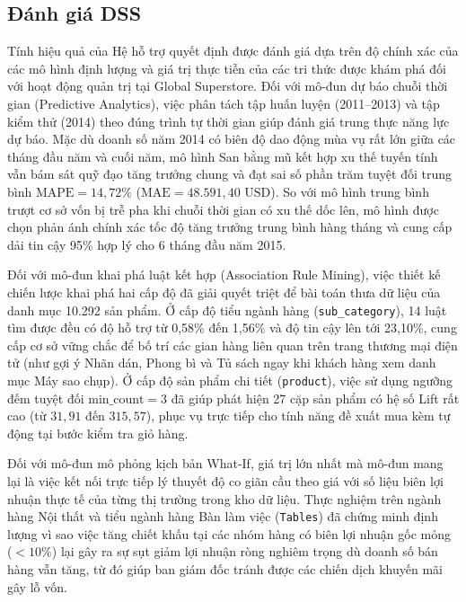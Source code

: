 \subsection{Đánh giá DSS}

Tính hiệu quả của Hệ hỗ trợ quyết định được đánh giá dựa trên độ chính xác của các mô hình định lượng và giá trị thực tiễn của các tri thức được khám phá đối với hoạt động quản trị tại Global Superstore. Đối với mô-đun dự báo chuỗi thời gian (Predictive Analytics), việc phân tách tập huấn luyện (2011--2013) và tập kiểm thử (2014) theo đúng trình tự thời gian giúp đánh giá trung thực năng lực dự báo. Mặc dù doanh số năm 2014 có biên độ dao động mùa vụ rất lớn giữa các tháng đầu năm và cuối năm, mô hình San bằng mũ kết hợp xu thế tuyến tính vẫn bám sát quỹ đạo tăng trưởng chung và đạt sai số phần trăm tuyệt đối trung bình $\text{MAPE} = 14,72\%$ ($\text{MAE} = 48.591,40\text{ USD}$). So với mô hình trung bình trượt cơ sở vốn bị trễ pha khi chuỗi thời gian có xu thế dốc lên, mô hình được chọn phản ánh chính xác tốc độ tăng trưởng trung bình hàng tháng và cung cấp dải tin cậy 95\% hợp lý cho 6 tháng đầu năm 2015.

Đối với mô-đun khai phá luật kết hợp (Association Rule Mining), việc thiết kế chiến lược khai phá hai cấp độ đã giải quyết triệt để bài toán thưa dữ liệu của danh mục 10.292 sản phẩm. Ở cấp độ tiểu ngành hàng (\texttt{sub\_category}), 14 luật tìm được đều có độ hỗ trợ từ 0,58\% đến 1,56\% và độ tin cậy lên tới 23,10\%, cung cấp cơ sở vững chắc để bố trí các gian hàng liên quan trên trang thương mại điện tử (như gợi ý Nhãn dán, Phong bì và Tủ sách ngay khi khách hàng xem danh mục Máy sao chụp). Ở cấp độ sản phẩm chi tiết (\texttt{product}), việc sử dụng ngưỡng đếm tuyệt đối $\text{min\_count} = 3$ đã giúp phát hiện 27 cặp sản phẩm có hệ số Lift rất cao (từ $31,91$ đến $315,57$), phục vụ trực tiếp cho tính năng đề xuất mua kèm tự động tại bước kiểm tra giỏ hàng.

Đối với mô-đun mô phỏng kịch bản What-If, giá trị lớn nhất mà mô-đun mang lại là việc kết nối trực tiếp lý thuyết độ co giãn cầu theo giá với số liệu biên lợi nhuận thực tế của từng thị trường trong kho dữ liệu. Thực nghiệm trên ngành hàng Nội thất và tiểu ngành hàng Bàn làm việc (\texttt{Tables}) đã chứng minh định lượng vì sao việc tăng chiết khấu tại các nhóm hàng có biên lợi nhuận gốc mỏng ($< 10\%$) lại gây ra sự sụt giảm lợi nhuận ròng nghiêm trọng dù doanh số bán hàng vẫn tăng, từ đó giúp ban giám đốc tránh được các chiến dịch khuyến mãi gây lỗ vốn.

